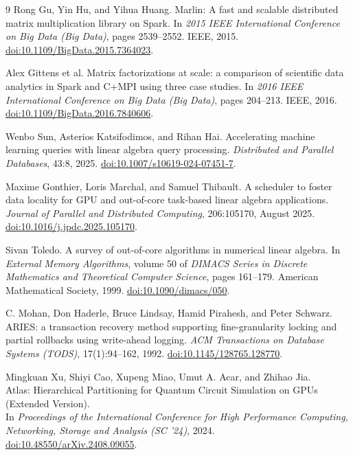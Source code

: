 \begin{thebibliography}{9}
Rong Gu, Yin Hu, and Yihua Huang.
\newblock Marlin: A fast and scalable distributed matrix multiplication library on Spark.
\newblock In \emph{2015 IEEE International Conference on Big Data (Big Data)}, pages 2539--2552. IEEE, 2015.
\newblock \href{https://doi.org/10.1109/BigData.2015.7364023}{doi:10.1109/BigData.2015.7364023}.

Alex Gittens et al.
\newblock Matrix factorizations at scale: a comparison of scientific data analytics in Spark and C+MPI using three case studies.
\newblock In \emph{2016 IEEE International Conference on Big Data (Big Data)}, pages 204--213. IEEE, 2016.
\newblock \href{https://doi.org/10.1109/BigData.2016.7840606}{doi:10.1109/BigData.2016.7840606}.

Wenbo Sun, Asterios Katsifodimos, and Rihan Hai.
\newblock Accelerating machine learning queries with linear algebra query processing.
\newblock \emph{Distributed and Parallel Databases}, 43:8, 2025.
\newblock \href{https://doi.org/10.1007/s10619-024-07451-7}{doi:10.1007/s10619-024-07451-7}.

Maxime Gonthier, Loris Marchal, and Samuel Thibault.
\newblock A scheduler to foster data locality for GPU and out-of-core task-based linear algebra applications.
\newblock \emph{Journal of Parallel and Distributed Computing}, 206:105170, August 2025.
\newblock \href{https://doi.org/10.1016/j.jpdc.2025.105170}{doi:10.1016/j.jpdc.2025.105170}.

Sivan Toledo.
\newblock A survey of out-of-core algorithms in numerical linear algebra.
\newblock In \emph{External Memory Algorithms}, volume 50 of \emph{DIMACS Series in Discrete Mathematics and Theoretical Computer Science}, pages 161--179. American Mathematical Society, 1999.
\newblock \href{https://doi.org/10.1090/dimacs/050}{doi:10.1090/dimacs/050}.

C. Mohan, Don Haderle, Bruce Lindsay, Hamid Pirahesh, and Peter Schwarz.
\newblock ARIES: a transaction recovery method supporting fine-granularity locking and partial rollbacks using write-ahead logging.
\newblock \emph{ACM Transactions on Database Systems (TODS)}, 17(1):94--162, 1992.
\newblock \href{https://doi.org/10.1145/128765.128770}{doi:10.1145/128765.128770}.

Mingkuan Xu, Shiyi Cao, Xupeng Miao, Umut A. Acar, and Zhihao Jia.\\
\newblock Atlas: Hierarchical Partitioning for Quantum Circuit Simulation on GPUs (Extended Version).\\
\newblock In \emph{Proceedings of the International Conference for High Performance Computing, Networking, Storage and Analysis (SC '24)}, 2024.\\
\newblock \href{https://doi.org/10.48550/arXiv.2408.09055}{doi:10.48550/arXiv.2408.09055}.


\end{thebibliography}
